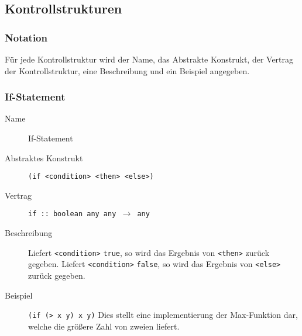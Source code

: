     \subsection{Kontrollstrukturen}
        \subsubsection{Notation}
            Für jede Kontrollstruktur wird der Name, das Abstrakte Konstrukt, der Vertrag der Kontrollstruktur, eine Beschreibung und ein Beispiel angegeben.


        \subsubsection{If-Statement}
            \label{racket:if}
            \begin{description}
                \item[Name] If-Statement
                \item[Abstraktes Konstrukt] \texttt{(if <condition> <then> <else>)}
                \item[Vertrag] \texttt{if :: boolean any any $ \rightarrow $ any}
                \item[Beschreibung] Liefert \texttt{<condition>} \texttt{true}, so wird das Ergebnis von \texttt{<then>} zurück gegeben. Liefert \texttt{<condition>} \texttt{false}, so wird das Ergebnis von \texttt{<else>} zurück gegeben.
                \item[Beispiel] \texttt{(if (> x y) x y)} Dies stellt eine implementierung der Max-Funktion dar, welche die größere Zahl von zweien liefert.
            \end{description}


